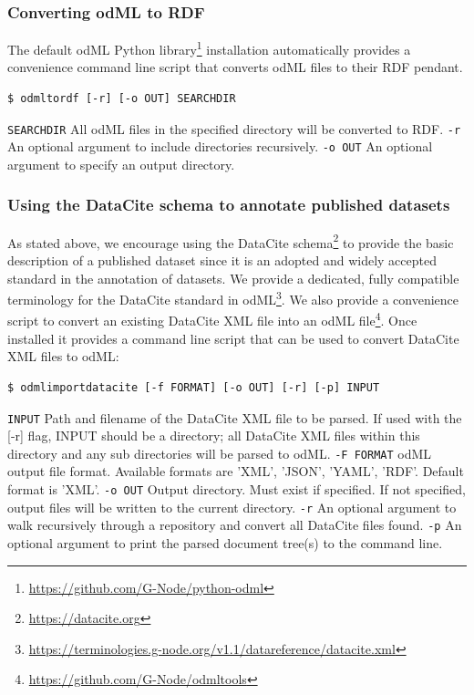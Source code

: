 \documentclass{article}
\begin{document}
\subsubsection{Converting odML to RDF} \label{sec:odml_conversion}
The default odML Python library\footnote{\url{https://github.com/G-Node/python-odml}} installation automatically provides a convenience command line script that converts odML files to their RDF pendant.

\begin{lstlisting}
$ odmltordf [-r] [-o OUT] SEARCHDIR
\end{lstlisting}

\texttt{SEARCHDIR} All odML files in the specified directory will be converted to RDF.
\texttt{-r} An optional argument to include directories recursively.
\texttt{-o OUT} An optional argument to specify an output directory.

\subsubsection{Using the DataCite schema to annotate published datasets} \label{sec:datacite}
As stated above, we encourage using the DataCite schema\footnote{\url{https://datacite.org}} to provide the basic description of a published dataset since it is an adopted and widely accepted standard in the annotation of datasets. We provide a dedicated, fully compatible terminology for the DataCite standard in odML\footnote{\url{https://terminologies.g-node.org/v1.1/datareference/datacite.xml}}. We also provide a convenience script to convert an existing DataCite XML file into an odML file\footnote{\url{https://github.com/G-Node/odmltools}}. Once installed it provides a command line script that can be used to convert DataCite XML files to odML:

\begin{lstlisting}
$ odmlimportdatacite [-f FORMAT] [-o OUT] [-r] [-p] INPUT
\end{lstlisting}

\texttt{INPUT} Path and filename of the DataCite XML file to be parsed. If used with the [-r] flag, INPUT should be a directory; all DataCite XML files within this directory and any sub directories will be parsed to odML.
\texttt{-F FORMAT} odML output file format. Available formats are 'XML', 'JSON', 'YAML', 'RDF'. Default format is 'XML'.
\texttt{-o OUT} Output directory. Must exist if specified. If not specified, output files will be written to the current directory.
\texttt{-r} An optional argument to walk recursively through a repository and convert all DataCite files found.
\texttt{-p} An optional argument to print the parsed document tree(s) to the command line.
\end{document}
